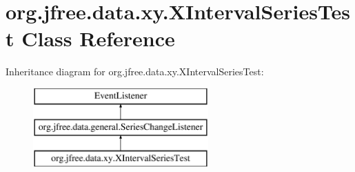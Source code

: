 \hypertarget{classorg_1_1jfree_1_1data_1_1xy_1_1_x_interval_series_test}{}\section{org.\+jfree.\+data.\+xy.\+X\+Interval\+Series\+Test Class Reference}
\label{classorg_1_1jfree_1_1data_1_1xy_1_1_x_interval_series_test}
Inheritance diagram for org.\+jfree.\+data.\+xy.\+X\+Interval\+Series\+Test\+:\begin{figure}[H]
\begin{center}
\leavevmode
\includegraphics[height=3.000000cm]{classorg_1_1jfree_1_1data_1_1xy_1_1_x_interval_series_test}
\end{center}
\end{figure}
